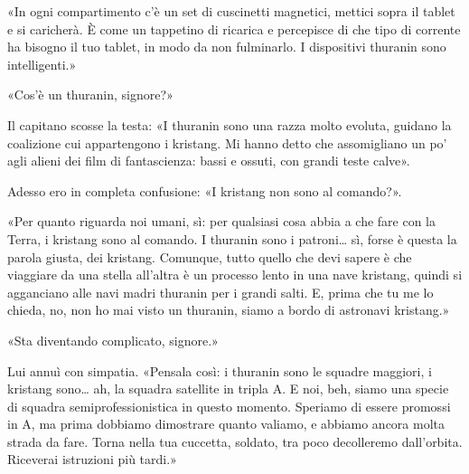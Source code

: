 «In ogni compartimento c'è un set di cuscinetti magnetici, mettici sopra
il tablet e si caricherà. È come un tappetino di ricarica e percepisce
di che tipo di corrente ha bisogno il tuo tablet, in modo da non
fulminarlo. I dispositivi thuranin sono intelligenti.»

«Cos'è un thuranin, signore?»

Il capitano scosse la testa: «I thuranin sono una razza molto evoluta,
guidano la coalizione cui appartengono i kristang. Mi hanno detto che
assomigliano un po' agli alieni dei film di fantascienza: bassi e
ossuti, con grandi teste calve».

Adesso ero in completa confusione: «I kristang non sono al comando?».

«Per quanto riguarda noi umani, sì: per qualsiasi cosa abbia a che fare
con la Terra, i kristang sono al comando. I thuranin sono i
patroni\ldots{} sì, forse è questa la parola giusta, dei kristang.
Comunque, tutto quello che devi sapere è che viaggiare da una stella
all'altra è un processo lento in una nave kristang, quindi si agganciano
alle navi madri thuranin per i grandi salti. E, prima che tu me lo
chieda, no, non ho mai visto un thuranin, siamo a bordo di astronavi
kristang.»

«Sta diventando complicato, signore.»

Lui annuì con simpatia. «Pensala così: i thuranin sono le squadre
maggiori, i kristang sono\ldots{} ah, la squadra satellite in tripla A.
E noi, beh, siamo una specie di squadra semiprofessionistica in questo
momento. Speriamo di essere promossi in A, ma prima dobbiamo dimostrare
quanto valiamo, e abbiamo ancora molta strada da fare. Torna nella tua
cuccetta, soldato, tra poco decolleremo dall'orbita. Riceverai
istruzioni più tardi.»

\hfill\break

